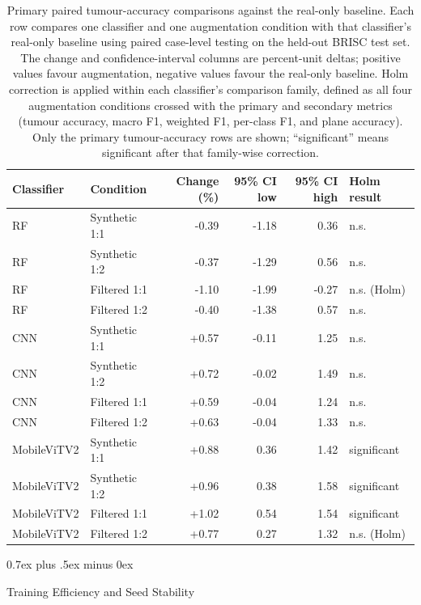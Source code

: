\documentclass[conference,twoside]{IEEEtran}
\makeatletter
\newcommand{\bodyfont}{\rmfamily}
\newcommand{\figfont}{\sffamily}
\DeclareRobustCommand{\plotmathversion}{}
\DeclareRobustCommand{\plotmathversion}{\mathversion{plotsans}}
\newcommand{\floatcaprule}{}
\newcommand{\plotfigurefont}{\figfont\plotmathversion}
\def\subsection{\@startsection{subsection}{2}{\z@}{1.5ex plus 1.5ex minus 0.5ex}%
{0.7ex plus .5ex minus 0ex}{\normalfont\normalsize\bodyfont\bfseries\raggedright}}
\makeatother
\begin{document}
\begin{table}[!b]
  \floatcaprule
\caption{Primary paired tumour-accuracy comparisons against the real-only baseline. Each row compares one classifier and one augmentation condition with that classifier's real-only baseline using paired case-level testing on the held-out BRISC test set. The change and confidence-interval columns are percent-unit deltas; positive values favour augmentation, negative values favour the real-only baseline. Holm correction is applied within each classifier's comparison family, defined as all four augmentation conditions crossed with the primary and secondary metrics (tumour accuracy, macro F1, weighted F1, per-class F1, and plane accuracy). Only the primary tumour-accuracy rows are shown; ``significant'' means significant after that family-wise correction.}
\label{tab:primary-paired}
\centering
\normalfont\plotfigurefont\scriptsize
\begin{tabularx}{\textwidth}{YYrrrY}
\toprule
Classifier & Condition & Change (\%) & 95\% CI low & 95\% CI high & Holm result \\
\midrule
RF & Synthetic 1:1 & -0.39 & -1.18 & 0.36 & n.s. \\
RF & Synthetic 1:2 & -0.37 & -1.29 & 0.56 & n.s. \\
RF & Filtered 1:1 & -1.10 & -1.99 & -0.27 & n.s. (Holm) \\
RF & Filtered 1:2 & -0.40 & -1.38 & 0.57 & n.s. \\
CNN & Synthetic 1:1 & +0.57 & -0.11 & 1.25 & n.s. \\
CNN & Synthetic 1:2 & +0.72 & -0.02 & 1.49 & n.s. \\
CNN & Filtered 1:1 & +0.59 & -0.04 & 1.24 & n.s. \\
CNN & Filtered 1:2 & +0.63 & -0.04 & 1.33 & n.s. \\
MobileViTV2 & Synthetic 1:1 & +0.88 & 0.36 & 1.42 & significant \\
MobileViTV2 & Synthetic 1:2 & +0.96 & 0.38 & 1.58 & significant \\
MobileViTV2 & Filtered 1:1 & +1.02 & 0.54 & 1.54 & significant \\
MobileViTV2 & Filtered 1:2 & +0.77 & 0.27 & 1.32 & n.s. (Holm) \\
\bottomrule
\end{tabularx}
\end{table}

\subsection{Training Efficiency and Seed Stability}
\label{sec:training-efficiency}
\end{document}
